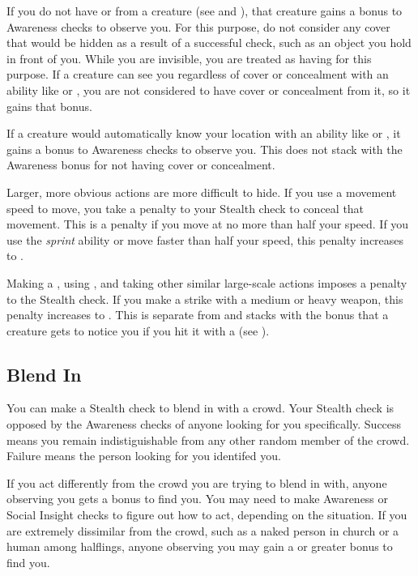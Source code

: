         If you do not have  or  from a creature (see  and ), that creature gains a  bonus to Awareness checks to observe you.
        For this purpose, do not consider any cover that would be hidden as a result of a successful check, such as an object you hold in front of you.
        While you are invisible, you are treated as having  for this purpose.
        If a creature can see you regardless of cover or concealment with an ability like  or , you are not considered to have cover or concealment from it, so it gains that  bonus.

        If a creature would automatically know your location with an ability like  or , it gains a  bonus to Awareness checks to observe you.
        This does not stack with the Awareness bonus for not having cover or concealment.

        Larger, more obvious actions are more difficult to hide.
        If you use a movement speed to move, you take a penalty to your Stealth check to conceal that movement.
        This is a  penalty if you move at no more than half your speed.
        If you use the \textit{sprint} ability or move faster than half your speed, this penalty increases to .

        Making a , using , and taking other similar large-scale actions imposes a  penalty to the Stealth check.
        If you make a strike with a medium or heavy weapon, this penalty increases to .
        This is separate from and stacks with the  bonus that a creature gets to notice you if you hit it with a  (see ).

    \subsection{Blend In}
        You can make a Stealth check to blend in with a crowd. Your Stealth check is opposed by the Awareness checks of anyone looking for you specifically. Success means you remain indistiguishable from any other random member of the crowd. Failure means the person looking for you identifed you.

        If you act differently from the crowd you are trying to blend in with, anyone observing you gets a  bonus to find you. You may need to make Awareness or Social Insight checks to figure out how to act, depending on the situation. If you are extremely dissimilar from the crowd, such as a naked person in church or a human among halflings, anyone observing you may gain a  or greater bonus to find you.

